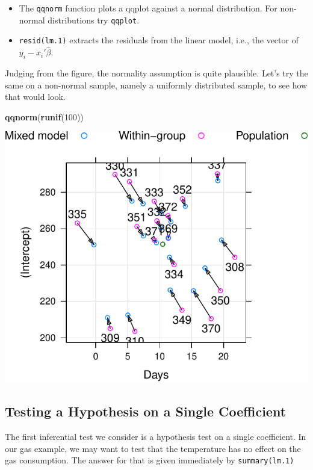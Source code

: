 \documentclass[]{book}
\newenvironment{Shaded}{\begin{snugshade}}{\end{snugshade}}
\newcommand{\DecValTok}[1]{\textcolor[rgb]{0.00,0.00,0.81}{#1}}
\newcommand{\FloatTok}[1]{\textcolor[rgb]{0.00,0.00,0.81}{#1}}
\newcommand{\KeywordTok}[1]{\textcolor[rgb]{0.13,0.29,0.53}{\textbf{#1}}}
\newcommand{\NormalTok}[1]{#1}
\newcommand{\OperatorTok}[1]{\textcolor[rgb]{0.81,0.36,0.00}{\textbf{#1}}}
\newcommand{\StringTok}[1]{\textcolor[rgb]{0.31,0.60,0.02}{#1}}
\providecommand{\tightlist}{%
  \setlength{\itemsep}{0pt}\setlength{\parskip}{0pt}}
\theoremstyle{definition}
\theoremstyle{definition}
\theoremstyle{definition}
\theoremstyle{remark}
\begin{document}
\begin{itemize}
\tightlist
\item
  The \texttt{qqnorm} function plots a qqplot against a normal distribution. For non-normal distributions try \texttt{qqplot}.
\item
  \texttt{resid(lm.1)} extracts the residuals from the linear model, i.e., the vector of \(y_i-x_i'\hat \beta\).
\end{itemize}

Judging from the figure, the normality assumption is quite plausible.
Let's try the same on a non-normal sample, namely a uniformly distributed sample, to see how that would look.

\begin{Shaded}
\begin{Highlighting}[]
\KeywordTok{qqnorm}\NormalTok{(}\KeywordTok{runif}\NormalTok{(}\DecValTok{100}\NormalTok{))}
\end{Highlighting}
\end{Shaded}

\includegraphics[width=0.5\linewidth]{Rcourse_files/figure-latex/unnamed-chunk-164-1}

\hypertarget{testing-a-hypothesis-on-a-single-coefficient}{%
\subsection{Testing a Hypothesis on a Single Coefficient}\label{testing-a-hypothesis-on-a-single-coefficient}}

The first inferential test we consider is a hypothesis test on a single coefficient.
In our gas example, we may want to test that the temperature has no effect on the gas consumption.
The answer for that is given immediately by \texttt{summary(lm.1)}

\begin{Shaded}
\end{Shaded}
\end{document}
